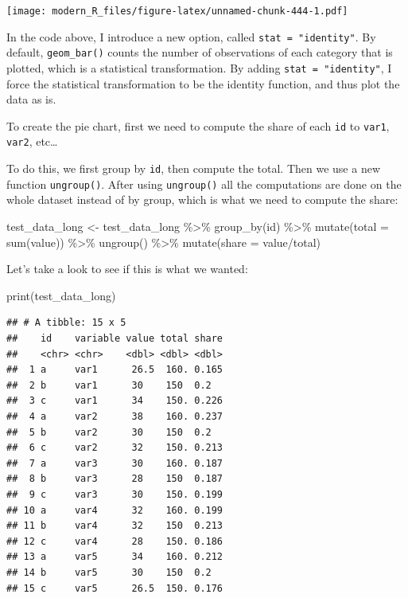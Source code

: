\documentclass[
]{article}
\newenvironment{Shaded}{\begin{snugshade}}{\end{snugshade}}
\newcommand{\AttributeTok}[1]{\textcolor[rgb]{0.77,0.63,0.00}{#1}}
\newcommand{\FunctionTok}[1]{\textcolor[rgb]{0.00,0.00,0.00}{#1}}
\newcommand{\NormalTok}[1]{#1}
\newcommand{\OtherTok}[1]{\textcolor[rgb]{0.56,0.35,0.01}{#1}}
\newcommand{\SpecialCharTok}[1]{\textcolor[rgb]{0.00,0.00,0.00}{#1}}
\begin{document}
\texttt{[image: modern\_R\_files/figure-latex/unnamed-chunk-444-1.pdf]}

In the code above, I introduce a new option, called \texttt{stat\ =\ "identity"}. By default, \texttt{geom\_bar()} counts
the number of observations of each category that is plotted, which is a statistical transformation.
By adding \texttt{stat\ =\ "identity"}, I force the statistical transformation to be the identity function, and
thus plot the data as is.

To create the pie chart, first we need to compute the share of each \texttt{id} to \texttt{var1}, \texttt{var2}, etc\ldots{}

To do this, we first group by \texttt{id}, then compute the total. Then we use a new function \texttt{ungroup()}.
After using \texttt{ungroup()} all the computations are done on the whole dataset instead of by group, which
is what we need to compute the share:

\begin{Shaded}
\begin{Highlighting}[]
\NormalTok{test\_data\_long }\OtherTok{\textless{}{-}}\NormalTok{ test\_data\_long }\SpecialCharTok{\%\textgreater{}\%}
  \FunctionTok{group\_by}\NormalTok{(id) }\SpecialCharTok{\%\textgreater{}\%}
  \FunctionTok{mutate}\NormalTok{(}\AttributeTok{total =} \FunctionTok{sum}\NormalTok{(value)) }\SpecialCharTok{\%\textgreater{}\%}
  \FunctionTok{ungroup}\NormalTok{() }\SpecialCharTok{\%\textgreater{}\%}
  \FunctionTok{mutate}\NormalTok{(}\AttributeTok{share =}\NormalTok{ value}\SpecialCharTok{/}\NormalTok{total)}
\end{Highlighting}
\end{Shaded}

Let's take a look to see if this is what we wanted:

\begin{Shaded}
\begin{Highlighting}[]
\FunctionTok{print}\NormalTok{(test\_data\_long)}
\end{Highlighting}
\end{Shaded}

\begin{verbatim}
## # A tibble: 15 x 5
##    id    variable value total share
##    <chr> <chr>    <dbl> <dbl> <dbl>
##  1 a     var1      26.5  160. 0.165
##  2 b     var1      30    150  0.2  
##  3 c     var1      34    150. 0.226
##  4 a     var2      38    160. 0.237
##  5 b     var2      30    150  0.2  
##  6 c     var2      32    150. 0.213
##  7 a     var3      30    160. 0.187
##  8 b     var3      28    150  0.187
##  9 c     var3      30    150. 0.199
## 10 a     var4      32    160. 0.199
## 11 b     var4      32    150  0.213
## 12 c     var4      28    150. 0.186
## 13 a     var5      34    160. 0.212
## 14 b     var5      30    150  0.2  
## 15 c     var5      26.5  150. 0.176
\end{verbatim}
\end{document}
